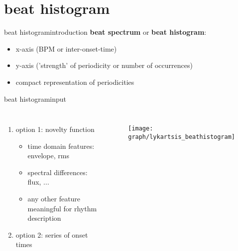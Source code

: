         \section[beat histogram]{beat histogram}
            \begin{frame}{beat histogram}{introduction}
                \textbf{beat spectrum} or \textbf{beat histogram}: 
                \begin{itemize}
                    \item   x-axis (BPM or inter-onset-time)
                    \item   y-axis ('strength' of periodicity or number of occurrences)
                    \bigskip
                    \item   compact representation of periodicities
                \end{itemize}
            \end{frame}
            \begin{frame}{beat histogram}{input}
                \begin{columns}[T]
                        \begin{enumerate}
                            \item<1->   option 1: novelty function
                                \begin{itemize}
                                    \item   time domain features: envelope, rms
                                    \item   spectral differences: flux, ...
                                    \item   any other feature meaningful for rhythm description
                                \end{itemize}
                            \bigskip
                            \item<1->   option 2: series of onset times
                        \end{enumerate}
                        \begin{figure}
                            \centering
                                \texttt{[image: graph/lykartsis\_beathistogram]}
                        \end{figure}
                \end{columns}
                
            \end{frame}
            
